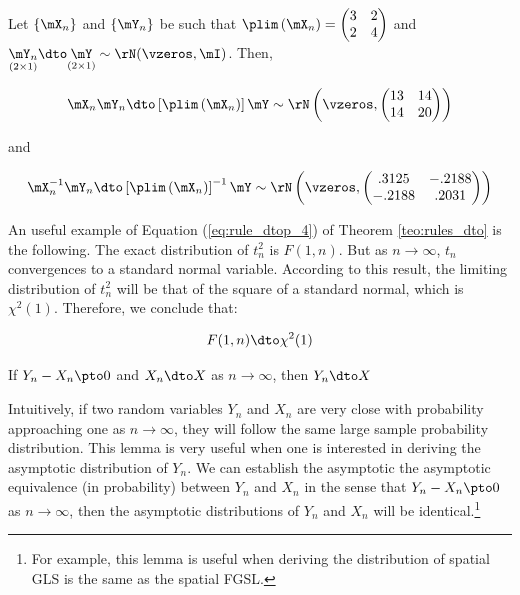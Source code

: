 \documentclass[english,12pt]{book}\usepackage[]{graphicx}\usepackage[]{xcolor}
\begin{document}
\begin{example}
Let $\left\lbrace \mX_n\right\rbrace$ and $\left\lbrace \mY_n\right\rbrace$ be such that $\plim\left(\mX_n\right) = \begin{pmatrix} 3 & 2 \\ 2 & 4 \end{pmatrix}$ and $\underset{(2\times 1)}{\mY_n}\dto\underset{(2\times 1)}{\mY}\sim \rN(\vzeros, \mI)$. Then, 

\begin{equation*}
  \mX_n\mY_n\dto \left[\plim\left(\mX_n\right)\right]\mY\sim \rN\left(\vzeros, \begin{pmatrix} 13 & 14 \\ 14 & 20\end{pmatrix}\right)
\end{equation*}

and

\begin{equation*}
  \mX_n^{-1}\mY_n\dto \left[\plim\left(\mX_n\right)\right]^{-1}\mY\sim \rN\left(\vzeros, \begin{pmatrix} .3125 & -.2188 \\ -.2188 & .2031\end{pmatrix}\right)
\end{equation*}
\end{example}

\begin{remark}
An useful example of Equation (\ref{eq:rule_dtop_4}) of Theorem \ref{teo:rules_dto} is the following. The exact distribution of $t_n^2$ is $F(1, n)$. But as $n\to \infty$, $t_n$ convergences to a standard normal variable. According to this result, the limiting distribution of $t_n^2$ will be that of the square of a standard normal, which is $\chi^2(1)$. Therefore, we conclude that:

\begin{equation*}
  F(1, n)\dto \chi^2(1)
\end{equation*}
\end{remark}


\begin{lemma}\label{lemma:asymptotic_equiv}
  If $Y_n - X_n\pto 0$ and $X_n\dto X$ as $n\to \infty$, then $Y_n\dto X$
\end{lemma}

Intuitively, if two random variables $Y_n$ and $X_n$ are very close with probability approaching one as $n\to \infty$, they will follow the same large sample probability distribution. This lemma is very useful when one is interested in deriving the asymptotic distribution of $Y_n$. We can establish the asymptotic the asymptotic equivalence (in probability) between $Y_n$ and $X_n$ in the sense that $Y_n - X_n\pto 0$ as $n\to \infty$, then the asymptotic distributions of $Y_n$ and $X_n$ will be identical.\footnote{For example, this lemma is useful when deriving the distribution of spatial GLS is the same as the spatial FGSL. } 
\end{document}
